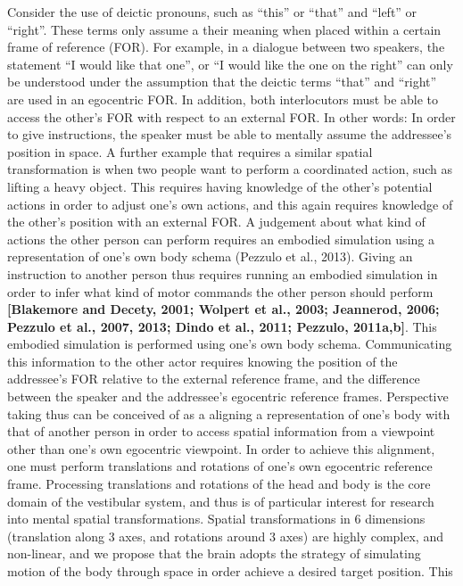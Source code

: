 \documentclass[english,floatsintext,man]{apa6}
\theoremstyle{definition}
\theoremstyle{definition}
\theoremstyle{remark}
\begin{document}
Consider the use of deictic pronouns, such as \enquote{this} or
\enquote{that} and \enquote{left} or \enquote{right}. These terms only
assume a their meaning when placed within a certain frame of reference
(FOR). For example, in a dialogue between two speakers, the statement
\enquote{I would like that one}, or \enquote{I would like the one on the
right} can only be understood under the assumption that the deictic
terms \enquote{that} and \enquote{right} are used in an egocentric FOR.
In addition, both interlocutors must be able to access the other's FOR
with respect to an external FOR. In other words: In order to give
instructions, the speaker must be able to mentally assume the
addressee's position in space. A further example that requires a similar
spatial transformation is when two people want to perform a coordinated
action, such as lifting a heavy object. This requires having knowledge
of the other's potential actions in order to adjust one's own actions,
and this again requires knowledge of the other's position with an
external FOR. A judgement about what kind of actions the other person
can perform requires an embodied simulation using a representation of
one's own body schema (Pezzulo et al., 2013). Giving an instruction to
another person thus requires running an embodied simulation in order to
infer what kind of motor commands the other person should perform
\textbf{{[}Blakemore and Decety, 2001; Wolpert et al., 2003; Jeannerod,
2006; Pezzulo et al., 2007, 2013; Dindo et al., 2011; Pezzulo,
2011a,b{]}}. This embodied simulation is performed using one's own body
schema. Communicating this information to the other actor requires
knowing the position of the addressee's FOR relative to the external
reference frame, and the difference between the speaker and the
addressee's egocentric reference frames. Perspective taking thus can be
conceived of as a aligning a representation of one's body with that of
another person in order to access spatial information from a viewpoint
other than one's own egocentric viewpoint. In order to achieve this
alignment, one must perform translations and rotations of one's own
egocentric reference frame. Processing translations and rotations of the
head and body is the core domain of the vestibular system, and thus is
of particular interest for research into mental spatial transformations.
Spatial transformations in 6 dimensions (translation along 3 axes, and
rotations around 3 axes) are highly complex, and non-linear, and we
propose that the brain adopts the strategy of simulating motion of the
body through space in order achieve a desired target position. This
\end{document}
